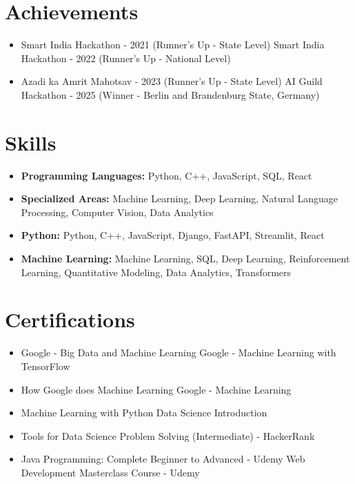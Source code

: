 \documentclass[a4paper,10pt]{article}
\begin{document}
\section*{Achievements}
\begin{itemize}
\item Smart India Hackathon - 2021 (Runner's Up - State Level) \hfill Smart India Hackathon - 2022 (Runner's Up - National Level)
\item Azadi ka Amrit Mahotsav - 2023 (Runner's Up - State Level) \hfill AI Guild Hackathon - 2025 (Winner - Berlin and Brandenburg State, Germany)
\end{itemize}

\section*{Skills}
\begin{itemize}
  \item \textbf{Programming Languages:} Python, C++, JavaScript, SQL, React
  \item \textbf{Specialized Areas:} Machine Learning, Deep Learning, Natural Language Processing, Computer Vision, Data Analytics
  \item \textbf{Python:} Python, C++, JavaScript, Django, FastAPI, Streamlit, React
  \item \textbf{Machine Learning:} Machine Learning, SQL, Deep Learning, Reinforcement Learning, Quantitative Modeling, Data Analytics, Transformers
\end{itemize}

\section*{Certifications}
\begin{itemize}
\item Google - Big Data and Machine Learning \hfill Google - Machine Learning with TensorFlow
\item How Google does Machine Learning \hfill Google - Machine Learning
\item Machine Learning with Python \hfill Data Science Introduction
\item Tools for Data Science \hfill Problem Solving (Intermediate) - HackerRank
\item Java Programming: Complete Beginner to Advanced - Udemy \hfill Web Development Masterclass Course - Udemy
\end{itemize}
\end{document}

